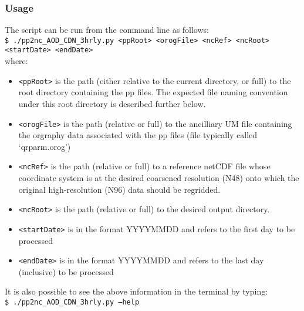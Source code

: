 \documentclass[10pt,a4paper]{article}
\newcommand\tab[1][0.5cm]{\hspace*{#1}}
\begin{document}
\subsubsection{Usage}
The script can be run from the command line as follows:\\
\tab \texttt{\$ ./pp2nc\_AOD\_CDN\_3hrly.py <ppRoot> <orogFile> <ncRef> <ncRoot> <startDate> <endDate>}\\
where:
\begin{itemize}
\item \texttt{<ppRoot>} is the path (either relative to the current directory, or full) to the root directory containing the pp files. The expected file naming convention under this root directory is described further below.
\item \texttt{<orogFile>} is the path (relative or full) to the ancilliary UM file containing the orgraphy data associated with the pp files (file typically called `qrparm.orog')
\item \texttt{<ncRef>} is the path (relative or full) to a reference netCDF file whose coordinate system is at the desired coarsened resolution (N48) onto which the original high-resolution (N96) data should be regridded.
\item \texttt{<ncRoot>} is the path (relative or full) to the desired output directory.
\item \texttt{<startDate>} is in the format YYYYMMDD and refers to the first day to be processed
\item \texttt{<endDate>} is in the format YYYYMMDD and refers to the last day (inclusive) to be processed 
\end{itemize}
It is also possible to see the above information in the terminal by typing:\\
\tab \texttt{\$ ./pp2nc\_AOD\_CDN\_3hrly.py --help}
\end{document}
